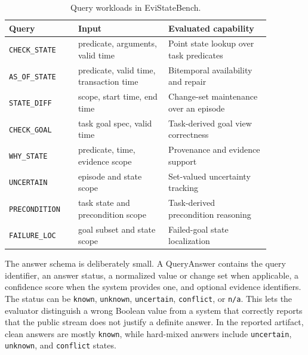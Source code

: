 \documentclass[conference]{IEEEtran}
\newcommand{\bench}{EviStateBench}
\begin{document}
\begin{table}[!t]
\caption{Query workloads in \bench.}
\label{tab:query-workloads}
\centering
\footnotesize
\begin{tabular}{@{}p{0.23\linewidth}p{0.30\linewidth}p{0.34\linewidth}@{}}
\toprule
Query & Input & Evaluated capability \\
\midrule
\texttt{CHECK\_STATE} & predicate, arguments, valid time & Point state lookup over task predicates \\
\texttt{AS\_OF\_STATE} & predicate, valid time, transaction time & Bitemporal availability and repair \\
\texttt{STATE\_DIFF} & scope, start time, end time & Change-set maintenance over an episode \\
\texttt{CHECK\_GOAL} & task goal spec, valid time & Task-derived goal view correctness \\
\texttt{WHY\_STATE} & predicate, time, evidence scope & Provenance and evidence support \\
\texttt{UNCERTAIN} & episode and state scope & Set-valued uncertainty tracking \\
\texttt{PRECONDITION} & task state and precondition scope & Task-derived precondition reasoning \\
\texttt{FAILURE\_LOC} & goal subset and state scope & Failed-goal state localization \\
\bottomrule
\end{tabular}
\end{table}

The answer schema is deliberately small. A QueryAnswer contains the query identifier, an answer status, a normalized value or change set when applicable, a confidence score when the system provides one, and optional evidence identifiers. The status can be \texttt{known}, \texttt{unknown}, \texttt{uncertain}, \texttt{conflict}, or \texttt{n/a}. This lets the evaluator distinguish a wrong Boolean value from a system that correctly reports that the public stream does not justify a definite answer. In the reported artifact, clean answers are mostly \texttt{known}, while hard-mixed answers include \texttt{uncertain}, \texttt{unknown}, and \texttt{conflict} states.
\end{document}
